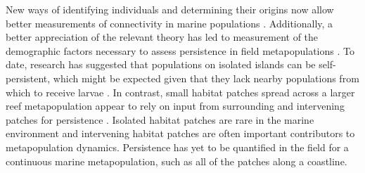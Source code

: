 \documentclass[12pt, oneside]{article}   	%
\begin{document}

New ways of identifying individuals and determining their origins now allow better measurements of connectivity in marine populations \citep{almany2017larval, daloia_self-recruitment_2013}. Additionally, a better appreciation of the relevant theory has led to measurement of the demographic factors necessary to assess persistence in field metapopulations \citep{carson2011evaluating, hameed2016inverse, johnson2018integrating, salles_coral_2015}. To date, research has suggested that populations on isolated islands can be self-persistent, which might be expected given that they lack nearby populations from which to receive larvae \citep{salles_coral_2015}. In contrast, small habitat patches spread across a larger reef metapopulation appear to rely on input from surrounding and intervening patches for persistence \citep{johnson2018integrating}. Isolated habitat patches are rare in the marine environment and intervening habitat patches are often important contributors to metapopulation dynamics. Persistence has yet to be quantified in the field for a continuous marine metapopulation, such as all of the patches along a coastline. 

\end{document}
